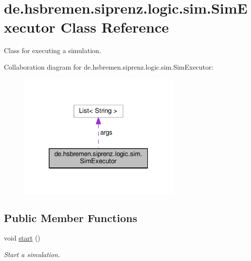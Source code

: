 \hypertarget{classde_1_1hsbremen_1_1siprenz_1_1logic_1_1sim_1_1SimExecutor}{}\section{de.\+hsbremen.\+siprenz.\+logic.\+sim.\+Sim\+Executor Class Reference}
\label{classde_1_1hsbremen_1_1siprenz_1_1logic_1_1sim_1_1SimExecutor}


Class for executing a simulation.  




Collaboration diagram for de.\+hsbremen.\+siprenz.\+logic.\+sim.\+Sim\+Executor\+:\nopagebreak
\begin{figure}[H]
\begin{center}
\leavevmode
\includegraphics[width=232pt]{classde_1_1hsbremen_1_1siprenz_1_1logic_1_1sim_1_1SimExecutor__coll__graph}
\end{center}
\end{figure}
\subsection*{Public Member Functions}
\begin{DoxyCompactItemize}
\item 
void \hyperlink{classde_1_1hsbremen_1_1siprenz_1_1logic_1_1sim_1_1SimExecutor_ae9a0ff34fd3f911ab69046f847eb5b31}{start} ()\hypertarget{classde_1_1hsbremen_1_1siprenz_1_1logic_1_1sim_1_1SimExecutor_ae9a0ff34fd3f911ab69046f847eb5b31}{}\label{classde_1_1hsbremen_1_1siprenz_1_1logic_1_1sim_1_1SimExecutor_ae9a0ff34fd3f911ab69046f847eb5b31}

\begin{DoxyCompactList}\small\item\em Start a simulation. \end{DoxyCompactList}\end{DoxyCompactItemize}


